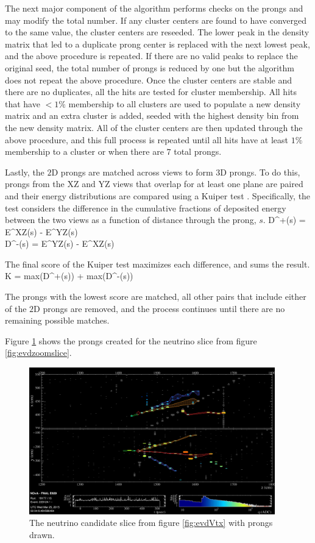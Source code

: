 The next major component of the algorithm performs checks on the prongs and may modify the total number. If any cluster centers are found to have converged to the same value, the cluster centers are reseeded. The lower peak in the density matrix that led to a duplicate prong center is replaced with the next lowest peak, and the above procedure is repeated. If there are no valid peaks to replace the original seed, the total number of prongs is reduced by one but the algorithm does not repeat the above procedure. Once the cluster centers are stable and there are no duplicates, all the hits are tested for cluster membership. All hits that have $< 1\%$ membership to all clusters are used to populate a new density matrix and an extra cluster is added, seeded with the highest density bin from the new density matrix. All of the cluster centers are then updated through the above procedure, and this full process is repeated until all hits have at least $1\%$ membership to a cluster or when there are $7$ total prongs.

Lastly, the $2$D prongs are matched across views to form $3$D prongs. To do this, prongs from the XZ and YZ views that overlap for at least one plane are paired and their energy distributions are compared using a Kuiper test \cite{ref:Kuiper}. Specifically, the test considers the difference in the cumulative fractions of deposited energy between the two views as a function of distance through the prong, $s$.
\beqa
D^+(s) = E^{XZ}(s) - E^{YZ}(s) \nonumber\\
D^-(s) = E^{YZ}(s) - E^{XZ}(s)
\label{eq:FuzzyDs}
\eeqa

\n The final score of the Kuiper test maximizes each difference, and sums the result.
\beq
K = \mbox{max}(D^+(s)) + \mbox{max}(D^-(s))
\label{eq:Kuiper}
\eeq

\n The prongs with the lowest score are matched, all other pairs that include either of the $2$D prongs are removed, and the process continues until there are no remaining possible matches.

Figure \ref{fig:evdProng} shows the prongs created for the neutrino slice from figure \ref{fig:evdzoomslice}.
\begin{figure}[htb]
  \centering
  \includegraphics[width=0.95\textwidth]{figures/evd/ZoomVtxProng.png}
  \caption[An Example Neutrino Candidate Slice with Prongs]{The neutrino candidate slice from figure \ref{fig:evdVtx} with prongs drawn.}
  \label{fig:evdProng}
\end{figure}

